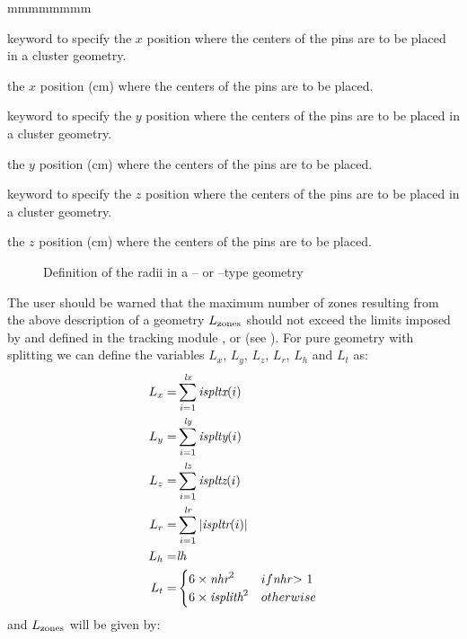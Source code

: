 \begin{ListeDeDescription}{mmmmmmmm}
\item[\moc{CPINX}] keyword to specify the $x$ position where the centers of the pins are
to be placed in a cluster geometry. 

\item[\dusa{xpins}] the $x$ position (cm) where the centers of the pins are to be
placed.

\item[\moc{CPINY}] keyword to specify the $y$ position where the centers of the pins are
to be placed in a cluster geometry. 

\item[\dusa{ypins}] the $y$ position (cm) where the centers of the pins are to be
placed.

\item[\moc{CPINZ}] keyword to specify the $z$ position where the centers of the pins are
to be placed in a cluster geometry. 

\item[\dusa{zpins}] the $z$ position (cm) where the centers of the pins are to be
placed.

\end{ListeDeDescription}

\begin{figure}[!]  
\begin{center} 
\epsfxsize=6cm
\centerline{ }
\parbox{16cm}{\caption{Definition of the radii in a -- or
--type geometry}\label{fig:radius}}    
\end{center}  
\end{figure}

The user should be warned that the maximum number of zones resulting from the above description of a geometry $L_{\rm{zones}}$ should not exceed the limits imposed by
 and defined in the tracking module ,  or
 (see ). For pure geometry with splitting we can define the variables $L_x$, $L_y$, $L_z$, $L_r$, $L_h$ and $L_{t}$ as:
  \begin{align*}
  L_x=&\sum_{i=1}^{\textit{lx}} \textit{ispltx}(i) \\ 
  L_y=&\sum_{i=1}^{\textit{ly}} \textit{isplty}(i) \\ 
  L_z=&\sum_{i=1}^{\textit{lz}} \textit{ispltz}(i) \\ 
  L_r=&\sum_{i=1}^{\textit{lr}} |\textit{ispltr}(i)| \\
  L_h=&\textit{lh} \\
  L_t=&\begin{cases}
  6\times\textit{nhr}^{2} &if $\textit{nhr}> 1$\\
  6\times\textit{isplith}^{2} &otherwise  \\ \end{cases}
  \end{align*}
and $L_{\rm{zones}}$ will be given by:

